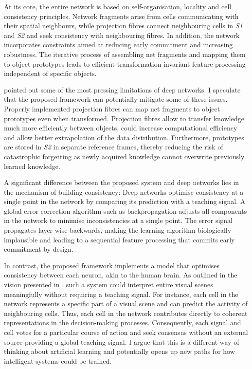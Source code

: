 At its core, the entire network is based on self-organisation, locality and cell consistency principles.
Network fragments arise from cells communicating with their spatial neighbours, while projection fibres connect neighbouring cells in \emph{S1} and \emph{S2} and seek consistency with neighbouring fibres.
In addition, the network incorporates constraints aimed at reducing early commitment and increasing robustness. The iterative process of assembling net fragments and mapping them to object prototypes leads to efficient transformation-invariant feature processing independent of specific objects.

 pointed out some of the most pressing limitations of deep networks.
I speculate that the proposed framework can potentially mitigate some of these issues. Properly implemented projection fibres can map net fragments to object prototypes even when transformed. Projection fibres allow to transfer knowledge  much more efficiently between objects, could increase computational efficiency and allow better extrapolation of the data distribution. Furthermore, prototypes are stored in \emph{S2} in separate reference frames, thereby reducing the risk of catastrophic forgetting  as newly acquired knowledge cannot overwrite previously learned knowledge.

A significant difference between the proposed system and deep networks lies in the mechanism of building consistency:
Deep networks optimise consistency at a single point in the network by comparing its prediction with a teaching signal.
A global error correction algorithm such as backpropagation adjusts all components in the network to minimise inconsistencies at a single point.
The error signal propagates layer-wise backwards, making the learning algorithm biologically implausible and leading to a sequential feature processing that commits early commitment  by design.

In contrast, the proposed framework implements a model that optimises consistency between each neuron, akin to the human brain.
As outlined in the vision presented in , such a system could interpret entire visual scenes meaningfully without requiring a teaching signal.
For instance, each cell in the network represents a specific part of a visual scene and can predict the activity of neighbouring cells.
Thus, each cell in the network contributes directly to coherent representations in the decision-making processes. Consequently, each signal and cell votes for a particular course of action and seek consensus without an external source providing a global teaching signal.
I argue that this is a different way of thinking about artificial learning and potentially opens up new paths for how intelligent systems could be trained.


